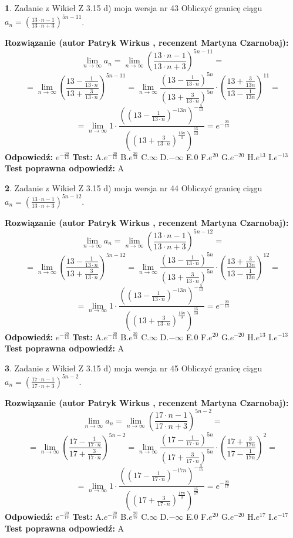 \documentclass[12pt, a4paper]{article}
\theoremstyle{definition} %
\newtheorem{zad}{}
\newcommand{\zadStart}[1]{\begin{zad}#1\newline}
\newcommand{\zadStop}{\end{zad}}
\newcommand{\rozwStart}[2]{\noindent \textbf{Rozwiązanie (autor #1 , recenzent #2): }\newline}
\newcommand{\rozwStop}{\newline}
\newcommand{\odpStart}{\noindent \textbf{Odpowiedź:}\newline}
\newcommand{\odpStop}{\newline}
\newcommand{\testStart}{\noindent \textbf{Test:}\newline}
\newcommand{\testStop}{\newline}
\newcommand{\kluczStart}{\noindent \textbf{Test poprawna odpowiedź:}\newline}
\newcommand{\kluczStop}{\newline}
\begin{document}
\zadStart{Zadanie z Wikieł Z 3.15 d) moja wersja nr 43}
Obliczyć granicę ciągu $a_{n}=(\frac{13\cdot n - 1}{13 \cdot n + 3})^{5n-11}$.
\zadStop
\rozwStart{Patryk Wirkus}{Martyna Czarnobaj}
$$\lim\limits_{n\to\infty} a_{n} = \lim\limits_{n\to\infty}(\frac{13\cdot n - 1}{13 \cdot n + 3})^{5n-11}=$$
$$=\lim\limits_{n\to\infty}(\frac{13 - \frac{1}{13\cdot n}}{13 + \frac{3}{13 \cdot n}})^{5n-11}=\lim\limits_{n\to\infty}\frac{(13 - \frac{1}{13\cdot n})^{5n}}{(13 + \frac{3}{13\cdot n})^{5n}} \cdot (\frac{13+\frac{3}{13n}}{13-\frac{1}{13n}})^{11}=$$
$$=\lim\limits_{n\to\infty} 1 \cdot \frac{((13-\frac{1}{13 \cdot n})^{-13n})^{-\frac{5}{13}}}{((13+\frac{3}{13 \cdot n})^{\frac{13n}{3}})^{\frac{15}{13}}} =e^{-\frac{20}{13}}$$
\rozwStop
\odpStart
$e^{-\frac{20}{13}}$
\odpStop
\testStart
A.$ e^{-\frac{20}{13}}$
B.$ e^{\frac{20}{13}}$
C.$\infty$
D.$-\infty$
E.$0$
F.$e^{20}$
G.$e^{-20}$
H.$e^{13}$
I.$e^{-13}$
\testStop
\kluczStart
A
\kluczStop



\zadStart{Zadanie z Wikieł Z 3.15 d) moja wersja nr 44}
Obliczyć granicę ciągu $a_{n}=(\frac{13\cdot n - 1}{13 \cdot n + 3})^{5n-12}$.
\zadStop
\rozwStart{Patryk Wirkus}{Martyna Czarnobaj}
$$\lim\limits_{n\to\infty} a_{n} = \lim\limits_{n\to\infty}(\frac{13\cdot n - 1}{13 \cdot n + 3})^{5n-12}=$$
$$=\lim\limits_{n\to\infty}(\frac{13 - \frac{1}{13\cdot n}}{13 + \frac{3}{13 \cdot n}})^{5n-12}=\lim\limits_{n\to\infty}\frac{(13 - \frac{1}{13\cdot n})^{5n}}{(13 + \frac{3}{13\cdot n})^{5n}} \cdot (\frac{13+\frac{3}{13n}}{13-\frac{1}{13n}})^{12}=$$
$$=\lim\limits_{n\to\infty} 1 \cdot \frac{((13-\frac{1}{13 \cdot n})^{-13n})^{-\frac{5}{13}}}{((13+\frac{3}{13 \cdot n})^{\frac{13n}{3}})^{\frac{15}{13}}} =e^{-\frac{20}{13}}$$
\rozwStop
\odpStart
$e^{-\frac{20}{13}}$
\odpStop
\testStart
A.$ e^{-\frac{20}{13}}$
B.$ e^{\frac{20}{13}}$
C.$\infty$
D.$-\infty$
E.$0$
F.$e^{20}$
G.$e^{-20}$
H.$e^{13}$
I.$e^{-13}$
\testStop
\kluczStart
A
\kluczStop



\zadStart{Zadanie z Wikieł Z 3.15 d) moja wersja nr 45}
Obliczyć granicę ciągu $a_{n}=(\frac{17\cdot n - 1}{17 \cdot n + 3})^{5n-2}$.
\zadStop
\rozwStart{Patryk Wirkus}{Martyna Czarnobaj}
$$\lim\limits_{n\to\infty} a_{n} = \lim\limits_{n\to\infty}(\frac{17\cdot n - 1}{17 \cdot n + 3})^{5n-2}=$$
$$=\lim\limits_{n\to\infty}(\frac{17 - \frac{1}{17\cdot n}}{17 + \frac{3}{17 \cdot n}})^{5n-2}=\lim\limits_{n\to\infty}\frac{(17 - \frac{1}{17\cdot n})^{5n}}{(17 + \frac{3}{17\cdot n})^{5n}} \cdot (\frac{17+\frac{3}{17n}}{17-\frac{1}{17n}})^{2}=$$
$$=\lim\limits_{n\to\infty} 1 \cdot \frac{((17-\frac{1}{17 \cdot n})^{-17n})^{-\frac{5}{17}}}{((17+\frac{3}{17 \cdot n})^{\frac{17n}{3}})^{\frac{15}{17}}} =e^{-\frac{20}{17}}$$
\rozwStop
\odpStart
$e^{-\frac{20}{17}}$
\odpStop
\testStart
A.$ e^{-\frac{20}{17}}$
B.$ e^{\frac{20}{17}}$
C.$\infty$
D.$-\infty$
E.$0$
F.$e^{20}$
G.$e^{-20}$
H.$e^{17}$
I.$e^{-17}$
\testStop
\kluczStart
A
\kluczStop
\end{document}
